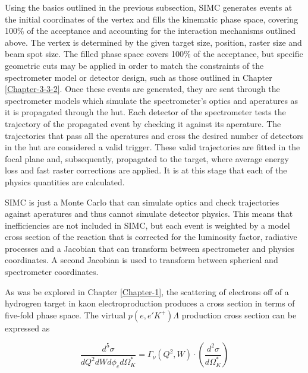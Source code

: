 \documentclass[
]{report}
\begin{document}
Using the basics outlined in the previous subsection, SIMC generates
events at the initial coordinates of the vertex and fills the kinematic
phase space, covering 100\% of the acceptance and accounting for the
interaction mechanisms outlined above. The vertex is determined by the
given target size, position, raster size and beam spot size. The filled
phase space covers 100\% of the acceptance, but specific geometric cuts
may be applied in order to match the constraints of the spectrometer
model or detector design, such as those outlined in Chapter
\ref{Chapter-3-3-2}. Once these events are generated, they are sent
through the spectrometer models which simulate the spectrometer's optics
and aperatures as it is propagated through the hut. Each detector of the
spectrometer tests the trajectory of the propagated event by checking it
against its aperature. The trajectories that pass all the aperatures and
cross the desired number of detectors in the hut are considered a valid
trigger. These valid trajectories are fitted in the focal plane and,
subsequently, propagated to the target, where average energy loss and
fast raster corrections are applied. It is at this stage that each of
the physics quantities are calculated.

SIMC is just a Monte Carlo that can simulate optics and check
trajectories against aperatures and thus cannot simulate detector
physics. This means that inefficiencies are not included in SIMC, but
each event is weighted by a model cross section of the reaction that is
corrected for the luminosity factor, radiative processes and a Jacobian
that can transform between spectrometer and physics coordinates. A
second Jacobian is used to transform between spherical and spectrometer
coordinates.

\label{Chapter-4-1}

As was be explored in Chapter \ref{Chapter-1}, the scattering of
electrons off of a hydrogren target in kaon electroproduction produces a
cross section in terms of five-fold phase space. The virtual
\(p(e,e'K^+)\Lambda\) production cross section can be expressed as

\begin{equation} 
  \frac{d^5\sigma}{dQ^2dWd\phi_ed\Omega^*_K}=\Gamma_{\nu}(Q^2,W)\cdot(\frac{d^2\sigma}{d\Omega^*_K})
  \label{eq:sig_orderfive_virtual_physics} 
\end{equation}
\end{document}
